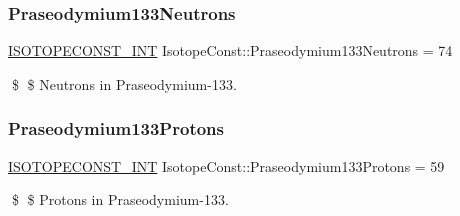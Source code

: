 \subsubsection{\texorpdfstring{Praseodymium133\+Neutrons}{Praseodymium133Neutrons}}
{\footnotesize\ttfamily \mbox{\hyperlink{group___isotope_const-_macros_ga5f18360b3e99483a35c32d789e62621c}{I\+S\+O\+T\+O\+P\+E\+C\+O\+N\+S\+T\+\_\+\+I\+NT}} Isotope\+Const\+::\+Praseodymium133\+Neutrons = 74}

\$ \$ Neutrons in Praseodymium-\/133. \mbox{\label{group___isotope_const-_praseodymium-_pr133_ga5b66a92f70c8268b764692cf5c92eb5e}} 
\subsubsection{\texorpdfstring{Praseodymium133\+Protons}{Praseodymium133Protons}}
{\footnotesize\ttfamily \mbox{\hyperlink{group___isotope_const-_macros_ga5f18360b3e99483a35c32d789e62621c}{I\+S\+O\+T\+O\+P\+E\+C\+O\+N\+S\+T\+\_\+\+I\+NT}} Isotope\+Const\+::\+Praseodymium133\+Protons = 59}

\$ \$ Protons in Praseodymium-\/133. 